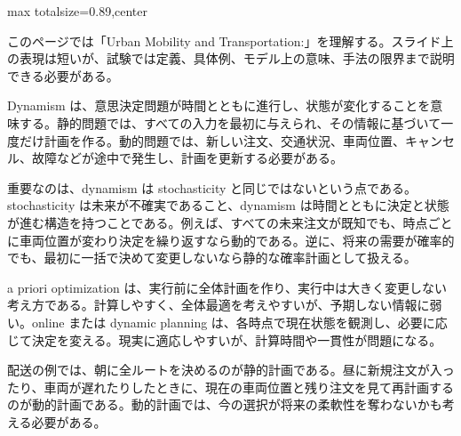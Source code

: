 \begin{minipage}[t]{0.58\textwidth}
\begin{adjustbox}{max totalsize={\textwidth}{0.89\textheight},center}
\begin{minipage}{\textwidth}\scriptsize
{}このページでは「Urban Mobility and Transportation:」を理解する。スライド上の表現は短いが、試験では定義、具体例、モデル上の意味、手法の限界まで説明できる必要がある。\par
Dynamism は、意思決定問題が時間とともに進行し、状態が変化することを意味する。静的問題では、すべての入力を最初に与えられ、その情報に基づいて一度だけ計画を作る。動的問題では、新しい注文、交通状況、車両位置、キャンセル、故障などが途中で発生し、計画を更新する必要がある。\par
重要なのは、dynamism は stochasticity と同じではないという点である。stochasticity は未来が不確実であること、dynamism は時間とともに決定と状態が進む構造を持つことである。例えば、すべての未来注文が既知でも、時点ごとに車両位置が変わり決定を繰り返すなら動的である。逆に、将来の需要が確率的でも、最初に一括で決めて変更しないなら静的な確率計画として扱える。\par
a priori optimization は、実行前に全体計画を作り、実行中は大きく変更しない考え方である。計算しやすく、全体最適を考えやすいが、予期しない情報に弱い。online または dynamic planning は、各時点で現在状態を観測し、必要に応じて決定を変える。現実に適応しやすいが、計算時間や一貫性が問題になる。\par
配送の例では、朝に全ルートを決めるのが静的計画である。昼に新規注文が入ったり、車両が遅れたりしたときに、現在の車両位置と残り注文を見て再計画するのが動的計画である。動的計画では、今の選択が将来の柔軟性を奪わないかも考える必要がある。\par

\end{minipage}
\end{adjustbox}
\end{minipage}
